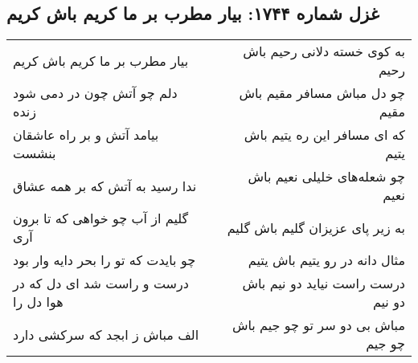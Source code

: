 \begin{center}
\section*{غزل شماره ۱۷۴۴: بیار مطرب بر ما کریم باش کریم}
\label{sec:1744}
\begin{longtable}{l p{0.5cm} r}
بیار مطرب بر ما کریم باش کریم
&&
به کوی خسته دلانی رحیم باش رحیم
\\
دلم چو آتش چون در دمی شود زنده
&&
چو دل مباش مسافر مقیم باش مقیم
\\
بیامد آتش و بر راه عاشقان بنشست
&&
که ای مسافر این ره یتیم باش یتیم
\\
ندا رسید به آتش که بر همه عشاق
&&
چو شعله‌های خلیلی نعیم باش نعیم
\\
گلیم از آب چو خواهی که تا برون آری
&&
به زیر پای عزیزان گلیم باش گلیم
\\
چو بایدت که تو را بحر دایه وار بود
&&
مثال دانه در رو یتیم باش یتیم
\\
درست و راست شد ای دل که در هوا دل را
&&
درست راست نیاید دو نیم باش دو نیم
\\
الف مباش ز ابجد که سرکشی دارد
&&
مباش بی دو سر تو چو جیم باش چو جیم
\\
\end{longtable}
\end{center}
